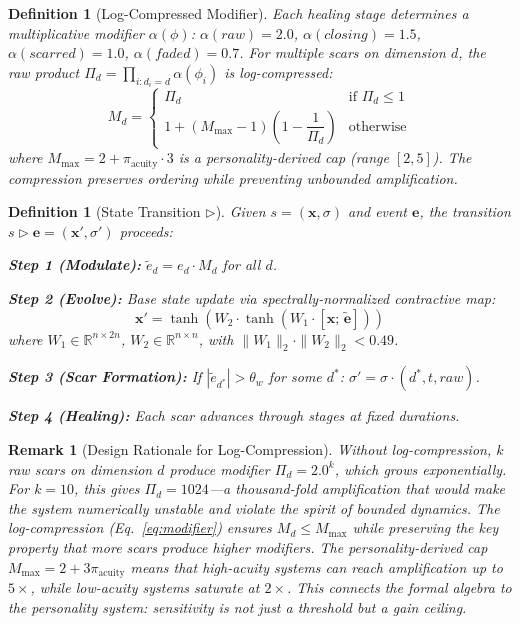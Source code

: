 \documentclass[11pt]{article}
\newtheorem{definition}[theorem]{Definition}
\newtheorem{remark}[theorem]{Remark}
\begin{document}
\begin{definition}[Log-Compressed Modifier]
\label{def:modifier}
Each healing stage determines a multiplicative modifier $\alpha(\phi)$: $\alpha(raw)=2.0$, $\alpha(closing)=1.5$, $\alpha(scarred)=1.0$, $\alpha(faded)=0.7$. For multiple scars on dimension $d$, the raw product $\Pi_d = \prod_{i: d_i=d} \alpha(\phi_i)$ is log-compressed:
\begin{equation}
M_d = \begin{cases}
\Pi_d & \text{if } \Pi_d \leq 1 \\[4pt]
1 + (M_{\max} - 1)\left(1 - \dfrac{1}{\Pi_d}\right) & \text{otherwise}
\end{cases}
\label{eq:modifier}
\end{equation}
where $M_{\max} = 2 + \pi_{\text{acuity}} \cdot 3$ is a personality-derived cap (range $[2, 5]$). The compression preserves ordering while preventing unbounded amplification.
\end{definition}

\begin{definition}[State Transition $\triangleright$]
\label{def:transition}
Given $s = (\mathbf{x}, \sigma)$ and event $\mathbf{e}$, the transition $s \triangleright \mathbf{e} = (\mathbf{x}', \sigma')$ proceeds:

\textbf{Step 1 (Modulate):} $\tilde{e}_d = e_d \cdot M_d$ for all $d$.

\textbf{Step 2 (Evolve):} Base state update via spectrally-normalized contractive map:
\begin{equation}
\mathbf{x}' = \tanh(W_2 \cdot \tanh(W_1 \cdot [\mathbf{x};\, \tilde{\mathbf{e}}]))
\label{eq:evolve}
\end{equation}
where $W_1 \in \mathbb{R}^{n \times 2n}$, $W_2 \in \mathbb{R}^{n \times n}$, with $\|W_1\|_2 \cdot \|W_2\|_2 < 0.49$.

\textbf{Step 3 (Scar Formation):} If $|\tilde{e}_{d^*}| > \theta_w$ for some $d^*$: $\sigma' = \sigma \cdot (d^*, t, raw)$.

\textbf{Step 4 (Healing):} Each scar advances through stages at fixed durations.
\end{definition}

\begin{remark}[Design Rationale for Log-Compression]
Without log-compression, $k$ raw scars on dimension $d$ produce modifier $\Pi_d = 2.0^k$, which grows exponentially. For $k = 10$, this gives $\Pi_d = 1024$---a thousand-fold amplification that would make the system numerically unstable and violate the spirit of bounded dynamics. The log-compression (Eq.~\ref{eq:modifier}) ensures $M_d \leq M_{\max}$ while preserving the key property that more scars produce higher modifiers. The personality-derived cap $M_{\max} = 2 + 3\pi_{\text{acuity}}$ means that high-acuity systems can reach amplification up to $5\times$, while low-acuity systems saturate at $2\times$. This connects the formal algebra to the personality system: sensitivity is not just a threshold but a gain ceiling.
\end{remark}
\end{document}
